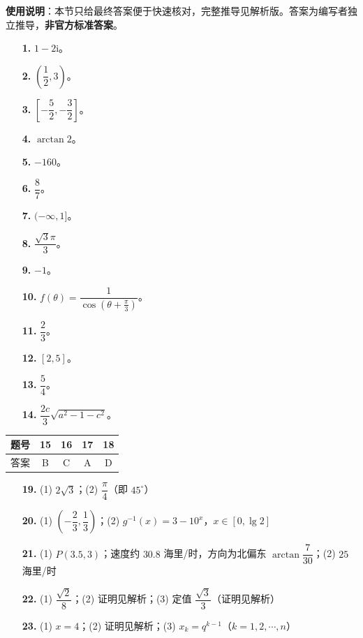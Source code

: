 
\begin{gknotice}
\textbf{使用说明}：本节只给最终答案便于快速核对，完整推导见解析版。答案为编写者独立推导，\textbf{非官方标准答案}。
\end{gknotice}

\begin{itemize}[leftmargin=2.6em]
  \item[\textbf{1.}] $1-2\mathrm i$。
  \item[\textbf{2.}] $\left(\dfrac12,3\right)$。
  \item[\textbf{3.}] $\left[-\dfrac52,-\dfrac32\right]$。
  \item[\textbf{4.}] $\arctan2$。
  \item[\textbf{5.}] $-160$。
  \item[\textbf{6.}] $\dfrac87$。
  \item[\textbf{7.}] $(-\infty,1]$。
  \item[\textbf{8.}] $\dfrac{\sqrt3\pi}3$。
  \item[\textbf{9.}] $-1$。
  \item[\textbf{10.}] $f(\theta)=\dfrac1{\cos\left(\theta+\frac\pi3\right)}$。
  \item[\textbf{11.}] $\dfrac23$。
  \item[\textbf{12.}] $[2,5]$。
  \item[\textbf{13.}] $\dfrac54$。
  \item[\textbf{14.}] $\dfrac{2c}3\sqrt{a^2-1-c^2}$。
\end{itemize}

\begin{center}\begin{tabular}{ccccc}
\toprule
题号 & 15 & 16 & 17 & 18 \\
\midrule
答案 & B & C & A & D \\
\bottomrule
\end{tabular}\end{center}

\begin{itemize}[leftmargin=2.6em]
  \item[\textbf{19.}] (1) $2\sqrt3$；(2) $\dfrac\pi4$（即 $45^\circ$）
  \item[\textbf{20.}] (1) $\left(-\dfrac23,\dfrac13\right)$；(2) $g^{-1}(x)=3-10^x$，$x\in[0,\lg2]$
  \item[\textbf{21.}] (1) $P(3.5,3)$；速度约 $30.8$ 海里/时，方向为北偏东 $\arctan\dfrac7{30}$；(2) $25$ 海里/时
  \item[\textbf{22.}] (1) $\dfrac{\sqrt2}8$；(2) 证明见解析；(3) 定值 $\dfrac{\sqrt3}3$（证明见解析）
  \item[\textbf{23.}] (1) $x=4$；(2) 证明见解析；(3) $x_k=q^{k-1}$（$k=1,2,\cdots,n$）
\end{itemize}
